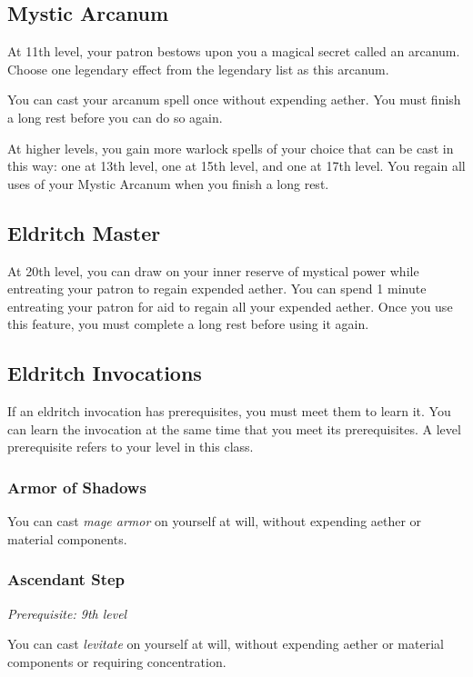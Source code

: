 \subsection{Mystic Arcanum}

At 11th level, your patron bestows upon you a magical secret called an arcanum. Choose one legendary effect from the legendary list as this arcanum.

You can cast your arcanum spell once without expending aether. You must finish a long rest before you can do so again.

At higher levels, you gain more warlock spells of your choice that can be cast in this way: one at 13th level, one at 15th level, and one at 17th level. You regain all uses of your Mystic Arcanum when you finish a long rest.

\subsection{Eldritch Master}

At 20th level, you can draw on your inner reserve of mystical power while entreating your patron to regain expended aether. You can spend 1 minute entreating your patron for aid to regain all your expended aether. Once you use this feature, you must complete a long rest before using it again.

\subsection{Eldritch Invocations}

If an eldritch invocation has prerequisites, you must meet them to learn it. You can learn the invocation at the same time that you meet its prerequisites. A level prerequisite refers to your level in this class.

\subsubsection{Armor of Shadows}

You can cast \textit{mage armor} on yourself at will, without expending aether or material components.

\subsubsection{Ascendant Step}

\textit{Prerequisite: 9th level}

You can cast \textit{levitate} on yourself at will, without expending aether or material components or requiring concentration.

